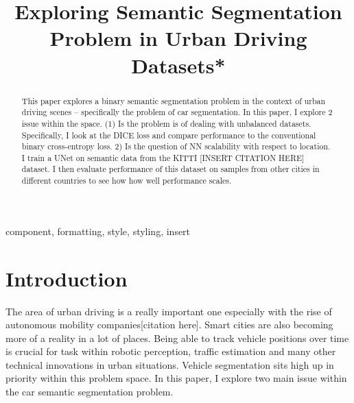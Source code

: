 \documentclass[Location Location Location! : Exploring Image Segmentation Problem In Urban Driving Scenarios]{IEEEtran}
\begin{document}
\title{Exploring Semantic Segmentation Problem in Urban Driving Datasets*\\

}

\author{
}

\maketitle

\begin{abstract}
This paper explores a binary semantic segmentation problem in the context of urban driving scenes -- specifically the problem of car segmentation. In this paper, I explore 2 issue within the space. (1) Is the problem is of dealing with unbalanced datasets. Specifically, I look at the DICE loss and compare performance to the conventional binary cross-entropy loss. 2) Is the question of NN scalability with respect to location. I train a UNet on semantic data from the KITTI [INSERT CITATION HERE] dataset. I then evaluate performance of this dataset on samples from other cities in different countries to see how how well performance scales.


\end{abstract}

\begin{IEEEkeywords}
component, formatting, style, styling, insert
\end{IEEEkeywords}

\section{Introduction}

The area of urban driving is a really important one especially with the rise of autonomous mobility companies[citation here]. Smart cities are also becoming more of a reality in a lot of places. Being able to track vehicle positions over time is crucial for task within robotic perception, traffic estimation and many other technical innovations in urban situations. Vehicle segmentation sits high up in priority within this problem space. In this paper, I explore two main issue within the car semantic segmentation problem. 
\end{document}
